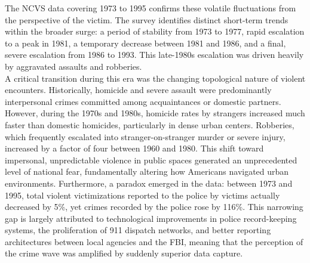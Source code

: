 \documentclass[
]{article}
\begin{document}
The NCVS data covering 1973 to 1995 confirms these volatile fluctuations
from the perspective of the victim. The survey identifies distinct
short-term trends within the broader surge: a period of stability from
1973 to 1977, rapid escalation to a peak in 1981, a temporary decrease
between 1981 and 1986, and a final, severe escalation from 1986 to 1993.
This late-1980s escalation was driven heavily by aggravated assaults and
robberies.\\
A critical transition during this era was the changing topological
nature of violent encounters. Historically, homicide and severe assault
were predominantly interpersonal crimes committed among acquaintances or
domestic partners. However, during the 1970s and 1980s, homicide rates
by strangers increased much faster than domestic homicides, particularly
in dense urban centers. Robberies, which frequently escalated into
stranger-on-stranger murder or severe injury, increased by a factor of
four between 1960 and 1980. This shift toward impersonal, unpredictable
violence in public spaces generated an unprecedented level of national
fear, fundamentally altering how Americans navigated urban environments.
Furthermore, a paradox emerged in the data: between 1973 and 1995, total
violent victimizations reported to the police by victims actually
decreased by 5\%, yet crimes recorded by the police rose by 116\%. This
narrowing gap is largely attributed to technological improvements in
police record-keeping systems, the proliferation of 911 dispatch
networks, and better reporting architectures between local agencies and
the FBI, meaning that the perception of the crime wave was amplified by
suddenly superior data capture.
\end{document}
